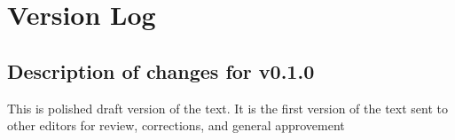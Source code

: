 \documentclass[twoside, openright]{report}
\begin{document}
        \fancyhead[LO]{}
        \chapter*{Version Log}
        
         
        \beginnumbering
         
        \bigskip
         \section*{Description of changes for v0.1.0} 
        \pstart
        This is polished draft version of the text. It is the first version of the text sent to other editors for review, corrections, and general approvement
        \pend
     
        \endnumbering
        
     
        
\end{document}
